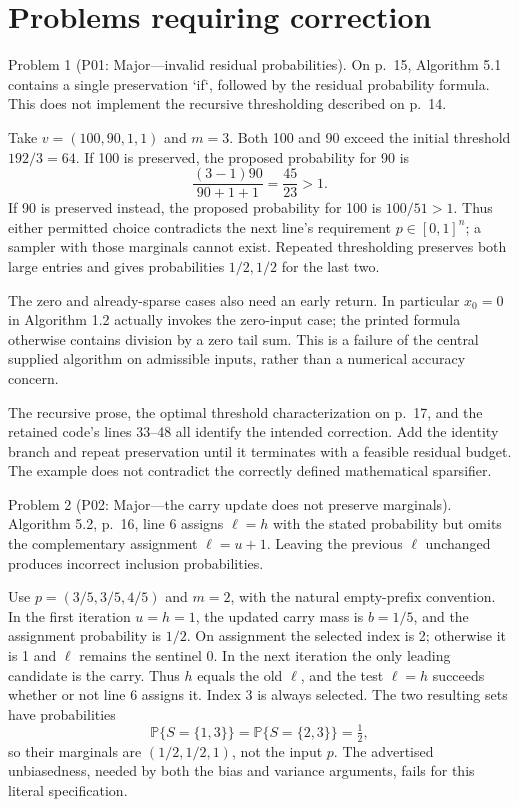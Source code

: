 \documentclass[10pt]{article}
\begin{document}
\section*{Problems requiring correction}
Problem 1 (P01: Major—invalid residual probabilities).  On p. 15, Algorithm 5.1 contains a single preservation `if`, followed by the residual probability formula. This does not implement the recursive thresholding described on p. 14.\par
Take \(v=(100,90,1,1)\) and \(m=3\). Both 100 and 90 exceed the initial threshold \(192/3=64\). If 100 is preserved, the proposed probability for 90 is \[\frac{(3-1)90}{90+1+1}=\frac{45}{23}>1.\] If 90 is preserved instead, the proposed probability for 100 is \(100/51>1\). Thus either permitted choice contradicts the next line’s requirement \(p\in[0,1]^n\); a sampler with those marginals cannot exist. Repeated thresholding preserves both large entries and gives probabilities \(1/2,1/2\) for the last two.\par
The zero and already-sparse cases also need an early return. In particular \(x_0=0\) in Algorithm 1.2 actually invokes the zero-input case; the printed formula otherwise contains division by a zero tail sum. This is a failure of the central supplied algorithm on admissible inputs, rather than a numerical accuracy concern.\par
The recursive prose, the optimal threshold characterization on p. 17, and the retained code’s lines 33–48 all identify the intended correction. Add the identity branch and repeat preservation until it terminates with a feasible residual budget. The example does not contradict the correctly defined mathematical sparsifier.\par
Problem 2 (P02: Major—the carry update does not preserve marginals).  Algorithm 5.2, p. 16, line 6 assigns \(\ell=h\) with the stated probability but omits the complementary assignment \(\ell=u+1\). Leaving the previous \(\ell\) unchanged produces incorrect inclusion probabilities.\par
Use \(p=(3/5,3/5,4/5)\) and \(m=2\), with the natural empty-prefix convention. In the first iteration \(u=h=1\), the updated carry mass is \(b=1/5\), and the assignment probability is \(1/2\). On assignment the selected index is 2; otherwise it is 1 and \(\ell\) remains the sentinel 0. In the next iteration the only leading candidate is the carry. Thus \(h\) equals the old \(\ell\), and the test \(\ell=h\) succeeds whether or not line 6 assigns it. Index 3 is always selected. The two resulting sets have probabilities \[\mathbb P\{S=\{1,3\}\}
 =\mathbb P\{S=\{2,3\}\}=\tfrac12,\] so their marginals are \((1/2,1/2,1)\), not the input \(p\). The advertised unbiasedness, needed by both the bias and variance arguments, fails for this literal specification.\par
\end{document}
